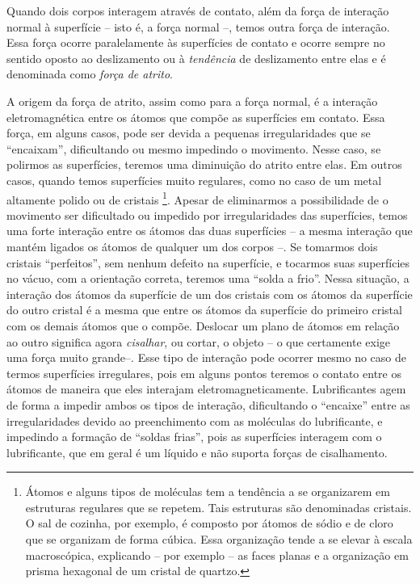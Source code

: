 Quando dois corpos interagem através de contato, além da força de interação normal à superfície -- isto é, a força normal --, temos outra força de interação. Essa força ocorre paralelamente às superfícies de contato e ocorre sempre no sentido oposto ao deslizamento ou à \emph{tendência} de deslizamento entre elas e é denominada como \emph{força de atrito}.

A origem da força de atrito, assim como para a força normal, é a interação eletromagnética entre os átomos que compõe as superfícies em contato. Essa força, em alguns casos, pode ser devida a pequenas irregularidades que se ``encaixam'', dificultando ou mesmo impedindo o movimento. Nesse caso, se polirmos as superfícies, teremos uma diminuição do atrito entre elas. Em outros casos, quando temos superfícies muito regulares, como no caso de um metal altamente polido ou de cristais \footnote{Átomos e alguns tipos de moléculas tem a tendência a se organizarem em estruturas regulares que se repetem. Tais estruturas são denominadas cristais. O sal de cozinha, por exemplo, é composto por átomos de sódio e de cloro que se organizam de forma cúbica. Essa organização tende a se elevar à escala macroscópica, explicando -- por exemplo -- as faces planas e a organização em prisma hexagonal de um cristal de quartzo.}. Apesar de eliminarmos a possibilidade de o movimento ser dificultado ou impedido por irregularidades das superfícies, temos uma forte interação entre os átomos das duas superfícies -- a mesma interação que mantém ligados os átomos de qualquer um dos corpos --. Se tomarmos dois cristais ``perfeitos'', sem nenhum defeito na superfície, e tocarmos suas superfícies no vácuo, com a orientação correta, teremos uma ``solda a frio''. Nessa situação, a interação dos átomos da superfície de um dos cristais com os átomos da superfície do outro cristal é a mesma que entre os átomos da superfície do primeiro cristal com os demais átomos que o compõe. Deslocar um plano de átomos em relação ao outro significa agora \emph{cisalhar}, ou cortar, o objeto -- o que certamente exige uma força muito grande--. Esse tipo de interação pode ocorrer mesmo no caso de termos superfícies irregulares, pois em alguns pontos teremos o contato entre os átomos de maneira que eles interajam eletromagneticamente. Lubrificantes agem de forma a impedir ambos os tipos de interação, dificultando o ``encaixe'' entre as irregularidades devido ao preenchimento com as moléculas do lubrificante, e impedindo a formação de ``soldas frias'', pois as superfícies interagem com o lubrificante, que em geral é um líquido e não suporta forças de cisalhamento.


